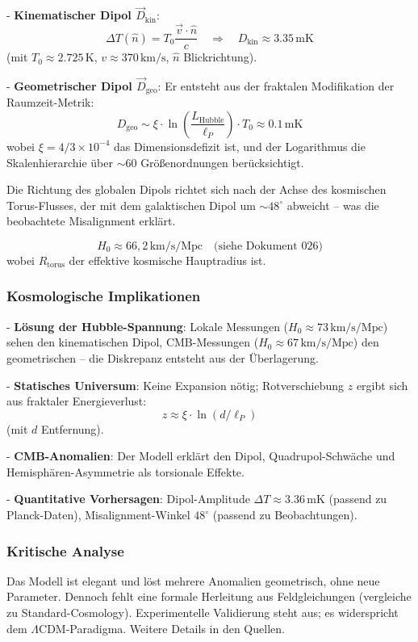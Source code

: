 	- \textbf{Kinematischer Dipol $\vec{D}_{\text{kin}}$}:
	\[
	\Delta T(\hat{n}) = T_0 \frac{\vec{v} \cdot \hat{n}}{c} \quad \Rightarrow \quad D_{\text{kin}} \approx 3.35\,\text{mK}
	\]
	(mit $T_0 \approx 2.725\,\text{K}$, $v \approx 370\,\text{km/s}$, $\hat{n}$ Blickrichtung).
	
	- \textbf{Geometrischer Dipol $\vec{D}_{\text{geo}}$}:
	Er entsteht aus der fraktalen Modifikation der Raumzeit-Metrik:
	\[
	D_{\text{geo}} \sim \xi \cdot \ln\left(\frac{L_{\text{Hubble}}}{\ell_P}\right) \cdot T_0 \approx 0.1\,\text{mK}
	\]
	wobei $\xi = 4/3 \times 10^{-4}$ das Dimensionsdefizit ist, und der Logarithmus die Skalenhierarchie über $\sim 60$ Größenordnungen berücksichtigt.
	
	Die Richtung des globalen Dipols richtet sich nach der Achse des kosmischen Torus-Flusses, der mit dem galaktischen Dipol um $\sim 48^\circ$ abweicht – was die beobachtete Misalignment erklärt.
	
	\[
	H_0 \approx 66{,}2\,\text{km/s/Mpc} \quad \text{(siehe Dokument~026)}
	\]
	wobei $R_{\text{torus}}$ der effektive kosmische Hauptradius ist.
	
	\subsubsection{Kosmologische Implikationen}
	
	- \textbf{Lösung der Hubble-Spannung}: Lokale Messungen ($H_0 \approx 73\,\text{km/s/Mpc}$) sehen den kinematischen Dipol, CMB-Messungen ($H_0 \approx 67\,\text{km/s/Mpc}$) den geometrischen – die Diskrepanz entsteht aus der Überlagerung.
	
	- \textbf{Statisches Universum}: Keine Expansion nötig; Rotverschiebung $z$ ergibt sich aus fraktaler Energieverlust:
	\[
	z \approx \xi \cdot \ln(d / \ell_P)
	\]
	(mit $d$ Entfernung).
	
	- \textbf{CMB-Anomalien}: Der Modell erklärt den Dipol, Quadrupol-Schwäche und Hemisphären-Asymmetrie als torsionale Effekte.
	
	- \textbf{Quantitative Vorhersagen}: Dipol-Amplitude $\Delta T \approx 3.36\,\text{mK}$ (passend zu Planck-Daten), Misalignment-Winkel $48^\circ$ (passend zu Beobachtungen).
	
	\subsubsection{Kritische Analyse}
	
	Das Modell ist elegant und löst mehrere Anomalien geometrisch, ohne neue Parameter. Dennoch fehlt eine formale Herleitung aus Feldgleichungen (vergleiche zu Standard-Cosmology). Experimentelle Validierung steht aus; es widerspricht dem $\Lambda$CDM-Paradigma. Weitere Details in den Quellen.
